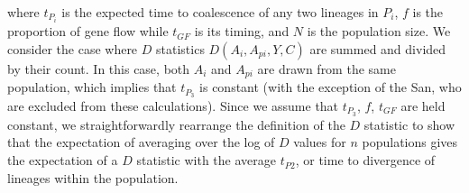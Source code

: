 \documentclass{article}
\begin{document}
where $t_{P_i}$ is the expected time to coalescence of any two lineages in $P_i$, $f$ is the proportion of gene flow while $t_{GF}$ is its timing, and $N$ is the population size. We consider the case where $D$ statistics $D(A_i, A_{pi}, Y, C)$ are summed and divided by their count. In this case, both $A_i$ and $A_{pi}$ are drawn from the same population, which implies that $t_{P_3}$ is constant (with the exception of the San, who are excluded from these calculations). Since we assume that $t_{P_3}$, $f$, $t_{GF}$ are held constant, we straightforwardly rearrange the definition of the $D$ statistic to show that the expectation of averaging over the log of $D$ values for $n$ populations gives the expectation of a $D$ statistic with the average $t_{P2}$, or time to divergence of lineages within the population.  

\small
\end{document}
